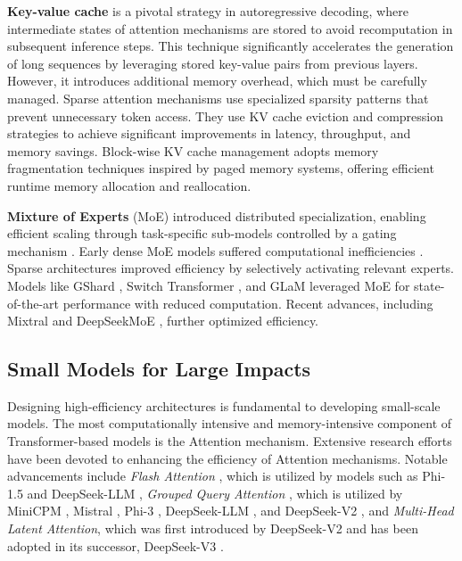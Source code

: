     \textbf{Key-value cache} is a pivotal strategy in autoregressive decoding, where intermediate states of attention mechanisms are stored to avoid recomputation in subsequent inference steps. This technique significantly accelerates the generation of long sequences by leveraging stored key-value pairs from previous layers. However, it introduces additional memory overhead, which must be carefully managed. 
    Sparse attention mechanisms \cite{zhang2023h2o, anagnostidis2024dynamic, liu2024scissorhands} use specialized sparsity patterns that prevent unnecessary token access. They use KV cache eviction and compression strategies to achieve significant improvements in latency, throughput, and memory savings.
    Block-wise KV cache management \cite{kwon2023efficient, prabhu2024vattention} adopts memory fragmentation techniques inspired by paged memory systems, offering efficient runtime memory allocation and reallocation.


    \textbf{Mixture of Experts} (MoE) introduced distributed specialization, enabling efficient scaling through task-specific sub-models controlled by a gating mechanism \citep{jacobs1991adaptive}.
    Early dense MoE models suffered computational inefficiencies \citep{jordan1994hierarchical}.
    Sparse architectures \citep{shazeer2017outrageously} improved efficiency by selectively activating relevant experts. Models like GShard \citep{lepikhin2020gshard}, Switch Transformer \citep{fedus2022review}, and GLaM \citep{du2022glam} leveraged MoE for state-of-the-art performance with reduced computation. Recent advances, including Mixtral \citep{jiang2024mixtral} and DeepSeekMoE \citep{dai2024deepseekmoe}, further optimized efficiency.

\subsection{Small Models for Large Impacts}

    Designing high-efficiency architectures is fundamental to developing small-scale models. 
    The most computationally intensive and memory-intensive component of Transformer-based models is the Attention mechanism. 
    Extensive research efforts have been devoted to enhancing the efficiency of Attention mechanisms. Notable advancements include \textit{Flash Attention} \cite{dao2022flashattention}, which is utilized by models such as Phi-1.5 \cite{li2023textbooks} and DeepSeek-LLM \cite{bi2024deepseek}, \textit{Grouped Query Attention} \cite{ainslie2023gqa}, which is utilized by MiniCPM \cite{hu2024minicpm}, Mistral \cite{jiang2023mistral}, Phi-3 \cite{abdin2024phi}, DeepSeek-LLM \cite{bi2024deepseek}, and DeepSeek-V2 \cite{liu2024deepseek}, and \textit{Multi-Head Latent Attention}, which was first introduced by DeepSeek-V2 \cite{liu2024deepseek} and has been adopted in its successor, DeepSeek-V3 \cite{liu2024deepseek3}.

